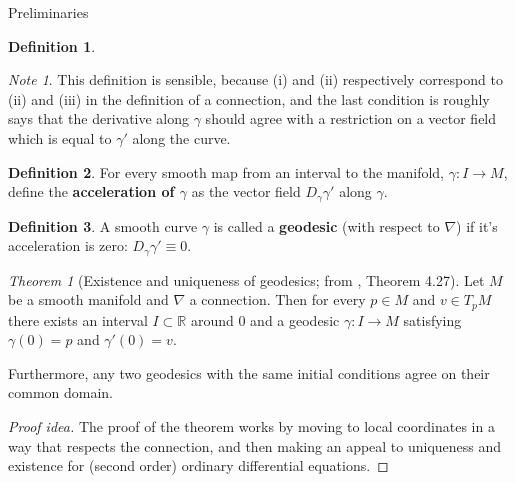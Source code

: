 \documentclass{article}
\newcommand{\fn}[3]{#1 \colon #2 \rightarrow #3}
\theoremstyle{definition}
\newtheorem{definition}{Definition}[section]
\theoremstyle{remark}
\newtheorem{remark}{Note}[section]
\newtheorem{theorem}{Theorem}[section]
\begin{document}
\begin{section}{Preliminaries}
\begin{definition}
\begin{enumerate}[(i)]
    \end{enumerate}
  \end{definition}
  \begin{remark}
    This definition is sensible, because (i) and (ii) respectively correspond to
    (ii) and (iii) in the definition of a connection, and the last condition is
    roughly says that the derivative along $\gamma$ should agree with a
    restriction on a vector field which is equal to $\gamma'$ along the curve.
  \end{remark}
  \begin{definition}
   For every smooth map from an interval to the manifold, $\fn \gamma I M$,
   define the \textbf{acceleration of $\gamma$} as the vector field
   $D_\gamma  \gamma'$ along $\gamma$.
  \end{definition}

  \begin{definition}
    A smooth curve $\gamma$ is called a \textbf{geodesic} (with respect to
    $\nabla$) if it's acceleration is zero: $D_\gamma \gamma' \equiv 0$.
  \end{definition}


  \begin{theorem}[Existence and uniqueness of geodesics; from \cite{Lee}, Theorem 4.27] %
    Let $M$ be a smooth manifold and $\nabla$ a connection. Then for every
    $p \in M$ and $v \in T_pM$ there exists an interval $I \subset \mathbb R$
    around $0$ and a geodesic
    $\fn \gamma I M$ satisfying $\gamma(0) = p$ and $\gamma'(0) = v$.

    Furthermore, any two geodesics with the same initial conditions agree on
    their common domain.
  \end{theorem}
  \begin{proof}[Proof idea]
    The proof of the theorem works by moving to local coordinates in a way that respects
    the connection, and then making an appeal to uniqueness and existence for
    (second order) ordinary differential equations.
  \end{proof}


\end{section}
\end{document}
